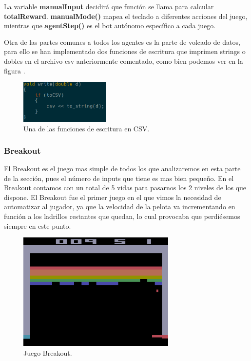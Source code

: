 La variable \textbf{manualInput} decidirá que función se llama para calcular \textbf{totalReward}. \textbf{manualMode()} mapea el teclado a diferentes acciones del juego, mientras que \textbf{agentStep()} es el bot autónomo específico a cada juego.

Otra de las partes comunes a todos los agentes es la parte de volcado de datos, para ello se han implementado dos funciones de escritura que imprimen strings o dobles en el archivo \ac{csv} anteriormente comentado, como bien podemos ver en la figura .

\begin{figure}[h]
	\centering
	\includegraphics[width=0.4\textwidth]{Figures/aledumpcsv}
	\caption{Una de las funciones de escritura en CSV.}
	\label{fig:aledumpcsv}
\end{figure}


\subsubsection{Breakout}
\label{subsec:botsbasicos:breakout}
El Breakout es el juego mas simple de todos los que analizaremos en esta parte de la sección, pues el número de inputs que tiene es mas bien pequeño. En el Breakout contamos con un total de 5 vidas para pasarnos los 2 niveles de los que dispone. El Breakout fue el primer juego en el que vimos la necesidad de automatizar al jugador, ya que la velocidad de la pelota va incrementando en función a los ladrillos restantes que quedan, lo cual provocaba que perdiésemos siempre en este punto.

\begin{figure}[h]
	\centering
	\includegraphics[width=0.7\textwidth]{Figures/breakoutgame}
	\caption{Juego Breakout.}
	\label{fig:breakoutgame}
\end{figure}


